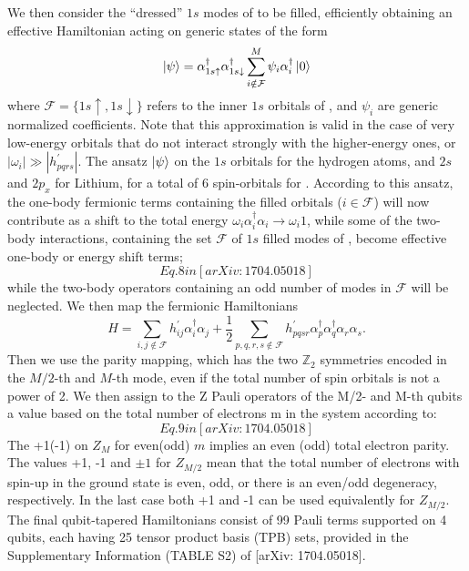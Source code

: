 \documentclass[11pt, oneside]{article}   	%
\begin{document}
We then consider the ``dressed'' $1s$ modes of  to be filled, efficiently obtaining an effective Hamiltonian acting on generic states of the form 
\begin{equation}
\ket{\psi} = \alpha^{\dagger}_{1s \uparrow} \alpha^{\dagger}_{1s \downarrow} \sum^M_{i \notin \mathcal{F}} \psi_i \alpha^{\dagger}_i \ket{0}
\end{equation}
where $\mathcal{F} = \{ 1s \uparrow, 1s \downarrow \}$ refers to the inner $1s$ orbitals of , and $\psi_i$ are generic normalized coefficients.
Note that this approximation is valid in the case of very low-energy orbitals that do not interact strongly with the higher-energy ones, or $|\omega_i| \gg |h^{\prime}_{pqrs}|$. 
The ansatz $\ket{\psi}$ on the $1s$ orbitals for the hydrogen atoms, and $2s$ and $2p_x$ for Lithium, for a total of 6 spin-orbitals for . 
According to this ansatz, the one-body fermionic terms containing the filled orbitals ($i \in \mathcal{F}$) will now contribute as a shift to the total energy 
$\omega_i  \alpha^{\dagger}_i  \alpha_i \to \omega_i 1$,
while some of the two-body interactions, containing the set $\mathcal{F}$ of $1s$ filled modes of , become effective one-body or energy shift terms;
\begin{equation}
Eq. 8 in [arXiv: 1704.05018]
\end{equation}
while the two-body operators containing an odd number of modes in $\mathcal{F}$ will be neglected. 
We then map the fermionic Hamiltonians
\begin{equation}
H = \sum_{i, j \notin \mathcal{F}} h^{\prime}_{ij} \alpha^{\dagger}_i \alpha_j
+ \frac{1}{2} \sum_{p, q, r, s \notin \mathcal{F}} h^{\prime}_{pqsr} \alpha^{\dagger}_p \alpha^{\dagger}_q \alpha_r \alpha_s.
\end{equation}
Then we use the parity mapping, which has the two $\mathbb{Z}_2$ symmetries encoded in the $M/2$-th and $M$-th mode, even if the total number of spin orbitals is not a power of 2.
We then assign to the Z Pauli operators of the M/2- and M-th qubits a value based on the total number of electrons m in the system according to:
\begin{equation}
Eq. 9 in [arXiv: 1704.05018]
\end{equation}
The +1(-1) on $Z_M$ for even(odd) $m$ implies an even (odd) total electron parity. 
The values +1, -1 and $\pm1$ for $Z_{M/2}$ mean that the total number of electrons with spin-up in the ground state is even, odd, or there is an even/odd degeneracy, respectively. 
In the last case both +1 and -1 can be used equivalently for $Z_{M/2}$. 
The final qubit-tapered Hamiltonians consist of 99 Pauli terms supported on 4 qubits, each having 25 tensor product basis (TPB) sets, provided in the Supplementary Information (TABLE S2) of [arXiv: 1704.05018].
\end{document}
